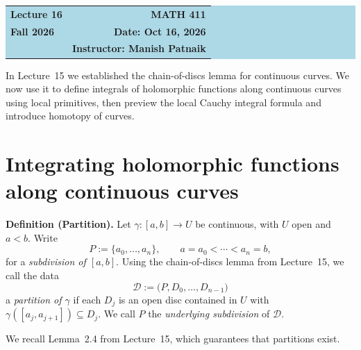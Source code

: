 \documentclass[11pt]{article}
\theoremstyle{plain}
\theoremstyle{definition}
\theoremstyle{remark}
\numberwithin{equation}{section}
\begin{document}
\begin{center}
  \colorbox{lightblue}{%
    \begin{minipage}{0.94\textwidth}
      \vspace{0.55em}
      \begin{tabular*}{\textwidth}{@{\extracolsep{\fill}}lr}
        {\color{courseblue}\bfseries\LARGE Lecture 16} &
        {\color{courseblue}\bfseries\LARGE MATH 411}\\[0.35em]
        \textbf{Fall 2026} & \textbf{Date: Oct 16, 2026}\\
        & \textbf{Instructor: Manish Patnaik}
      \end{tabular*}
      \vspace{0.45em}
    \end{minipage}}
\end{center}

\setcounter{tocdepth}{1}
\tableofcontents
\vspace{0.45em}

In Lecture~15 we established the chain-of-discs lemma for continuous curves.
We now use it to define integrals of holomorphic functions along continuous
curves using local primitives, then preview the local Cauchy integral formula
and introduce homotopy of curves.

\section{Integrating holomorphic functions along continuous curves}
\begin{tcolorbox}[
 enhanced,
 unbreakable,
 colback=lightyellow,
 colframe=warningyellow,
 boxrule=0.7pt,
 arc=2pt,
 left=6pt,
 right=6pt,
 top=5pt,
 bottom=5pt
]
\textbf{Definition (Partition).} Let $\gamma\colon[a,b]\to U$ be
continuous, with $U$ open and $a<b$. Write
\[
 P:=\{a_0,\ldots,a_n\},\qquad a=a_0<\cdots<a_n=b,
\]
for a \emph{subdivision of $[a,b]$}. Using the chain-of-discs lemma
from Lecture~15, we call the data
\[
 \mathscr{D}:=\bigl(P,D_0,\ldots,D_{n-1}\bigr)
\]
a \emph{partition of $\gamma$} if each
$D_j$ is an open disc contained in $U$ with
$\gamma([a_j,a_{j+1}])\subseteq D_j$.
We call $P$ the \emph{underlying subdivision} of $\mathscr{D}$.
\end{tcolorbox}

We recall Lemma~2.4 from Lecture~15, which guarantees that partitions exist.
\end{document}
